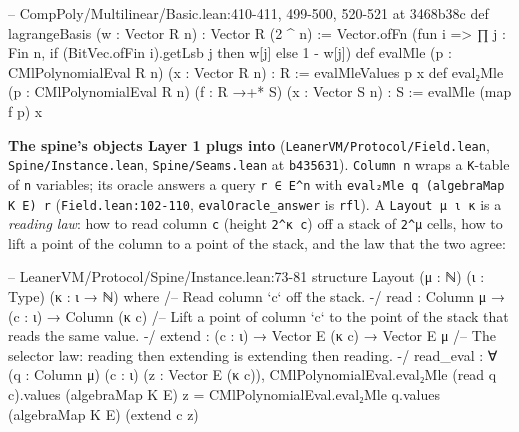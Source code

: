 \begin{leancode}
-- CompPoly/Multilinear/Basic.lean:410-411, 499-500, 520-521 at 3468b38c
def lagrangeBasis (w : Vector R n) : Vector R (2 ^ n) :=
  Vector.ofFn (fun i => ∏ j : Fin n, if (BitVec.ofFin i).getLsb j then w[j] else 1 - w[j])
def evalMle (p : CMlPolynomialEval R n) (x : Vector R n) : R :=
  evalMleValues p x
def eval₂Mle (p : CMlPolynomialEval R n) (f : R →+* S) (x : Vector S n) : S :=
  evalMle (map f p) x
\end{leancode}

\textbf{The spine's objects Layer 1 plugs into} (\texttt{LeanerVM/\allowbreak{}Protocol/\allowbreak{}Field.\allowbreak{}lean}, \texttt{Spine/\allowbreak{}Instance.\allowbreak{}lean}, \texttt{Spine/\allowbreak{}Seams.\allowbreak{}lean} at \texttt{b435631}). \texttt{Column n} wraps a \texttt{K}-table of \texttt{n} variables; its oracle answers a query \texttt{r ∈ E\textasciicircum{}n} with \texttt{e\allowbreak{}v\allowbreak{}a\allowbreak{}l\allowbreak{}₂\allowbreak{}M\allowbreak{}l\allowbreak{}e\allowbreak{} q\allowbreak{} (\allowbreak{}a\allowbreak{}l\allowbreak{}g\allowbreak{}e\allowbreak{}b\allowbreak{}r\allowbreak{}a\allowbreak{}M\allowbreak{}a\allowbreak{}p\allowbreak{} K\allowbreak{} E\allowbreak{})\allowbreak{} r} (\texttt{Field.\allowbreak{}lean:102-{}110}, \texttt{evalOracle\_\allowbreak{}answer} is \texttt{rfl}). A \texttt{Layout μ ι κ} is a \emph{reading law}: how to read column \texttt{c} (height \texttt{2\textasciicircum{}κ c}) off a stack of \texttt{2\textasciicircum{}μ} cells, how to lift a point of the column to a point of the stack, and the law that the two agree:

\begin{leancode}
-- LeanerVM/Protocol/Spine/Instance.lean:73-81
structure Layout (μ : ℕ) (ι : Type) (κ : ι → ℕ) where
  /-- Read column `c` off the stack. -/
  read : Column μ → (c : ι) → Column (κ c)
  /-- Lift a point of column `c` to the point of the stack that reads the same value. -/
  extend : (c : ι) → Vector E (κ c) → Vector E μ
  /-- The selector law: reading then extending is extending then reading. -/
  read_eval : ∀ (q : Column μ) (c : ι) (z : Vector E (κ c)),
    CMlPolynomialEval.eval₂Mle (read q c).values (algebraMap K E) z =
      CMlPolynomialEval.eval₂Mle q.values (algebraMap K E) (extend c z)
\end{leancode}

